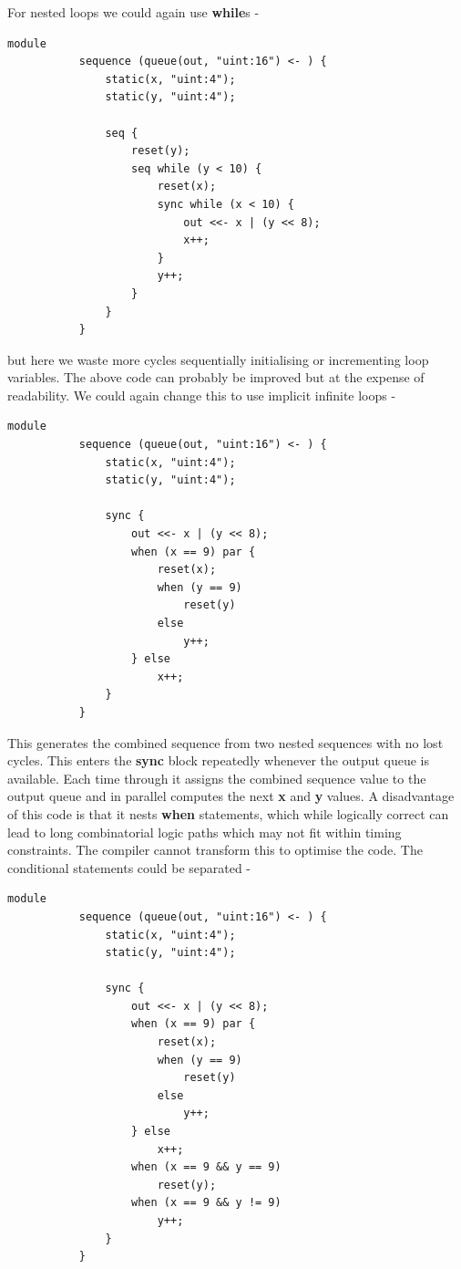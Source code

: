         For nested loops we could again use {\bf while}s -
        \begin{lstlisting}[gobble=8, language=threepl]
           module
           sequence (queue(out, "uint:16") <- ) {
               static(x, "uint:4");
               static(y, "uint:4");
               
               seq {
                   reset(y);
                   seq while (y < 10) {
                       reset(x);
                       sync while (x < 10) {
                           out <<- x | (y << 8);
                           x++;
                       }
                       y++;
                   }
               }
           }
        \end{lstlisting}
        but here we waste more cycles sequentially initialising or
        incrementing loop variables. The above code can probably be
        improved but at the expense of readability. We could again
        change this to use implicit infinite loops -
        \begin{lstlisting}[gobble=8, language=threepl]
           module
           sequence (queue(out, "uint:16") <- ) {
               static(x, "uint:4");
               static(y, "uint:4");
               
               sync {
                   out <<- x | (y << 8);
                   when (x == 9) par {
                       reset(x);
                       when (y == 9)
                           reset(y)
                       else
                           y++;
                   } else
                       x++;
               }
           }
        \end{lstlisting}
        This generates the combined sequence from two nested sequences with no
        lost cycles. This enters the {\bf sync} block repeatedly whenever the
        output queue is available. Each time through it assigns the combined
        sequence value to the output queue and in parallel computes the next {\bf
        x} and {\bf y} values. A disadvantage of this code is that it nests {\bf
        when} statements, which while logically correct can lead to long
        combinatorial logic paths which may not fit within timing constraints.
        The compiler cannot transform this to optimise the code.
        The conditional statements could be separated -
        \begin{lstlisting}[gobble=8, language=threepl]
           module
           sequence (queue(out, "uint:16") <- ) {
               static(x, "uint:4");
               static(y, "uint:4");
               
               sync {
                   out <<- x | (y << 8);
                   when (x == 9) par {
                       reset(x);
                       when (y == 9)
                           reset(y)
                       else
                           y++;
                   } else
                       x++;
                   when (x == 9 && y == 9)
                       reset(y);
                   when (x == 9 && y != 9)
                       y++;
               }
           }
        \end{lstlisting}
